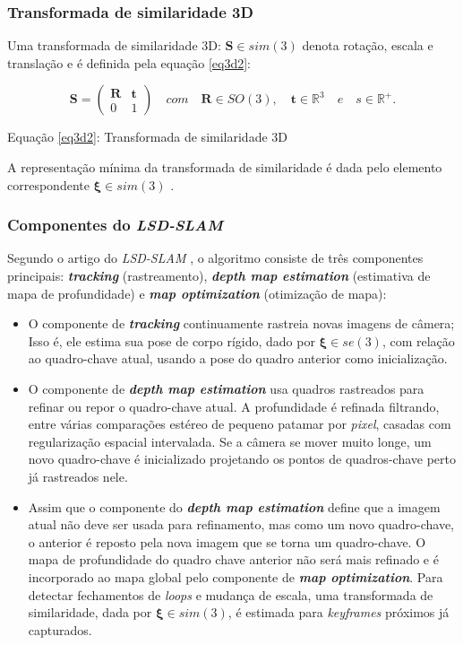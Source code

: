 \subsubsection{Transformada de similaridade 3D}

Uma transformada de similaridade 3D: $\mathbf{S}\in sim(3)$ denota rotação, escala e translação e é definida pela equação \eqref{eq3d2}:
 
 \begin{equation}\label{eq3d2}
 \mathbf{S} = 
 \begin{pmatrix}
 \mathbf{R} & \mathbf{t} \\
 0  & 1
 \end{pmatrix}
\quad com \quad \mathbf{R} \in SO(3), \quad \mathbf{t} \in \mathbb{R}^{3} \quad e \quad s \in \mathbb{R}^+.
 \end{equation} 

Equação \eqref{eq3d2}: Transformada de similaridade 3D
 
A representação mínima da transformada de similaridade é dada pelo elemento correspondente $\mathbf{\xi} \in sim(3)$ \cite[p. 5]{LSD-SLAM-Artigo}.

\subsubsection{Componentes do \textit{LSD-SLAM}}

Segundo o artigo do \textit{LSD-SLAM} \cite{LSD-SLAM-Artigo}, o algoritmo consiste de três componentes principais: \textbf{\textit{tracking}} (rastreamento), \textbf{\textit{depth map estimation}} (estimativa de mapa de profundidade) e \textbf{\textit{map optimization}} (otimização de mapa):

\begin{itemize}
	\item{O componente de \textbf{\textit{tracking}} continuamente rastreia novas imagens de câmera; Isso é, ele estima sua pose de corpo rígido, dado por $\mathbf{\xi} \in se(3)$, com relação ao quadro-chave atual, usando a pose do quadro anterior como inicialização.}
	\item{O componente de \textbf{\textit{depth map estimation}} usa quadros rastreados para refinar ou repor o quadro-chave atual. A profundidade é refinada filtrando, entre várias comparações estéreo de pequeno patamar por \textit{pixel}, casadas com regularização espacial intervalada. Se a câmera se mover muito longe, um novo quadro-chave é inicializado projetando os pontos de quadros-chave perto já rastreados nele.}
	\item{Assim que o componente do \textbf{\textit{depth map estimation}} define que a imagem atual não deve ser usada para refinamento, mas como um novo quadro-chave, o anterior é reposto pela nova imagem que se torna um quadro-chave. O mapa de profundidade do quadro chave anterior não será mais refinado e é incorporado ao mapa global pelo componente de \textbf{\textit{map optimization}}. Para detectar fechamentos de \textit{loops} e mudança de escala, uma transformada de similaridade, dada por $\mathbf{\xi} \in sim(3)$, é estimada para \textit{keyframes} próximos já capturados.}
\end{itemize}	